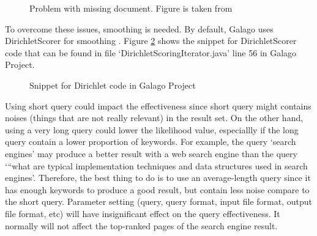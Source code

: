 \documentclass[letterpaper,11pt]{article}
\begin{document}
\begin{figure}[H]
	\centering
	\caption{Problem with missing document. Figure is taken from \cite{language-model}}
	\label{fig:7_8_zero_problem}
\end{figure}

To overcome these issues, smoothing is needed. By default, Galago uses DirichletScorer for smoothing \cite{galago-default-smoothing}. Figure \ref{fig:7_8_dirichlet} shows the snippet for DirichletScorer code that can be found in file `DirichletScoringIterator.java' line 56 in Galago Project. 

\begin{figure}[H]
	\centering
	\caption{Snippet for Dirichlet code in Galago Project}
	\label{fig:7_8_dirichlet}
\end{figure}

Using short query could impact the effectiveness since short query might contains noises (things that are not really relevant) in the result set. On the other hand, using a very long query could lower the likelihood value, especiallly if the long query contain a lower proportion of keywords. For example, the query `search engines' may produce a better result with a web search engine than the query `“what are typical implementation techniques and data structures used in search engines'. Therefore, the best thing to do is to use an average-length query since it has enough keywords to produce a good result, but contain less noise compare to the short query. \newline
Parameter setting (query, query format, input file format, output file format, etc) will have insignificant effect on the query effectiveness. It normally will not affect the top-ranked pages of the search engine result. 

\noindent\makebox[\linewidth]{\rule{\textwidth}{0.4pt}}


\medskip


\end{document}
